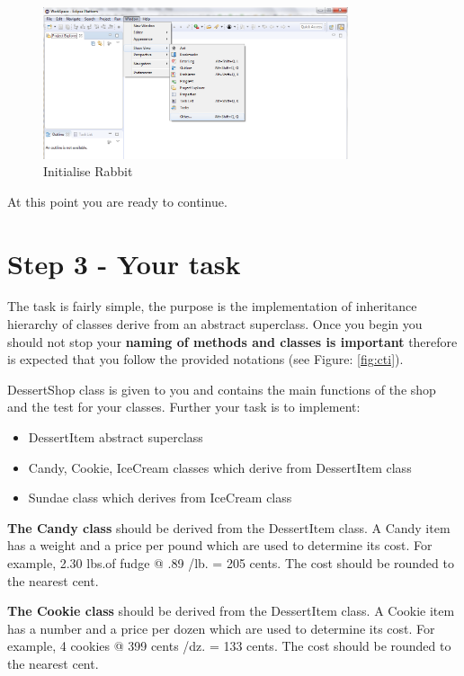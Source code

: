 \begin{figure}[!ht]
		\begin{center}		 	
			\includegraphics[width=0.8\textwidth]{figures/ws1.png}
		\end{center}
		\caption{Initialise Rabbit}
		\label{fig:ir1}
	\end{figure}

At this point you are ready to continue.

\section{Step 3 - Your task}
The task is fairly simple, the purpose is the implementation of inheritance hierarchy of classes derive from an abstract superclass. Once you begin you should not stop your \textbf{naming of methods and classes is important} therefore is expected that you follow the provided notations (see Figure: \ref{fig:cti}).

DessertShop class is given to you and contains the main functions of the shop and the test for your classes. Further your task is to implement:

\begin{itemize}
	\item DessertItem abstract superclass
	\item Candy, Cookie, IceCream classes which derive from DessertItem class
	\item Sundae class which derives from IceCream class
\end{itemize}

\textbf{The Candy class} should be derived from the DessertItem class. A Candy item has a weight and a price per pound which are used to determine its cost. For example, 2.30 lbs.of fudge @ .89 /lb. = 205 cents. The cost should be rounded to the nearest cent.

\textbf{The Cookie class} should be derived from the DessertItem class. A Cookie item has a number and a price per dozen which are used to determine its cost. For example, 4 cookies @ 399 cents /dz. = 133 cents. The cost should be rounded to the nearest cent.

